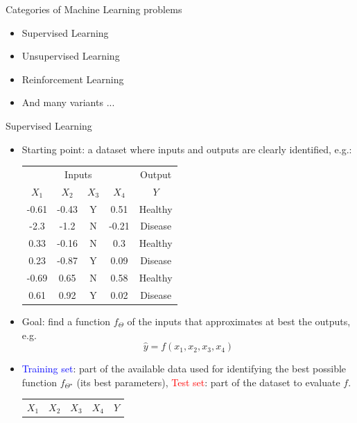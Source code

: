 \begin{frame}{Categories of Machine Learning problems}
  \begin{itemize}
    \item Supervised Learning
    \item Unsupervised Learning
    \item Reinforcement Learning
    \item And many variants ...
  \end{itemize}
\end{frame}

\begin{frame}[allowframebreaks]{Supervised Learning}
  \begin{itemize}
    \item Starting point:  a dataset where inputs and outputs are clearly identified, e.g.:
    \begin{center}
      \begin{tabular}{*{4}{c} c}
        \toprule
        \multicolumn{4}{c}{Inputs} & Output \\
        $X_1$ & $X_2$ & $X_3$ & $X_4$ & $Y$  \\
        \midrule
        -0.61 & -0.43 & Y & 0.51 & Healthy \\
        -2.3 & -1.2 & N & -0.21 & Disease \\
        0.33 & -0.16 & N & 0.3 & Healthy \\
        0.23 & -0.87 & Y & 0.09 & Disease \\
        -0.69 & 0.65 & N & 0.58 & Healthy \\
        0.61 & 0.92 & Y & 0.02 & Disease \\
        \bottomrule
      \end{tabular}
    \end{center}
    \item Goal: find a function $f_{\Theta}$ of the inputs that approximates at best the outputs, e.g.
    $$\hat{y} = f(x_1,x_2,x_3,x_4 )$$ 
    \item \textcolor{blue}{Training set}: part of the available data used for identifying the best possible function $f_{\Theta^\star}$ (its best parameters), \textcolor{red}{Test set}: part of the dataset to evaluate $f$.
    \begin{center}
      \begin{tabular}{*{4}{c} c}
        \toprule
        $X_1$ & $X_2$ & $X_3$ & $X_4$ & $Y$  \\

\end{tabular}
\end{center}
\end{itemize}
\end{frame}
